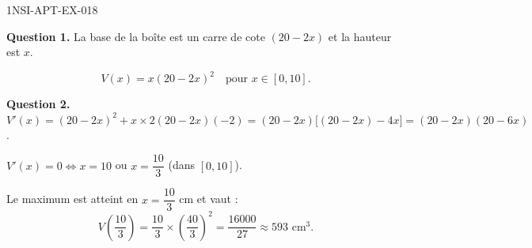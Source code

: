 \begin{corrige}{1NSI-APT-EX-018}

\textbf{Question 1.} La base de la boîte est un carre de cote $(20 - 2x)$ et la hauteur est $x$.


\[ V(x) = x(20 - 2x)^2 \quad \text{pour } x \in [0, 10]. \]

\textbf{Question 2.} $V'(x) = (20-2x)^2 + x \times 2(20-2x)(-2) = (20-2x)\bigl[(20-2x) - 4x\bigr] = (20-2x)(20-6x)$.

$V'(x) = 0 \iff x = 10$ ou $x = \dfrac{10}{3}$ (dans $[0,10]$).

Le maximum est atteint en $x = \dfrac{10}{3}$ cm et vaut :
\[ V\!\left(\dfrac{10}{3}\right) = \dfrac{10}{3} \times \left(\dfrac{40}{3}\right)^2 = \dfrac{16000}{27} \approx 593 \text{ cm}^3. \]

\end{corrige}
